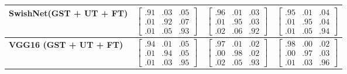 \begin{table}
\begin{tabular}{M{13em}P{6.5em}P{6.5em}P{6.5em}}
		\midrule
		\textbf{SwishNet(GST + UT + FT)} 
		& $\begin{bmatrix}
		.91 & .03 & .05\\
		.01 & .92 & .07\\
		.01 & .05 & .93
		\end{bmatrix}$ & 
		$\begin{bmatrix}
		.96 & .01 & .03\\
		.01 & .95 & .03\\
		.02 & .06 & .92
		\end{bmatrix}$ 
		& $\begin{bmatrix}
		.95 & .01 & .04\\
		.01 & .95 & .04\\
		.01 & .05 & .94
		\end{bmatrix}$ \\
		
		\midrule 
		\textbf{VGG16 (GST + UT + FT)} 
		& $\begin{bmatrix}
		.94 & .01 & .05\\
		.01 & .94 & .05\\
		.01 & .03 & .95
		\end{bmatrix}$ 
		& $\begin{bmatrix}
		.97 & .01 & .02\\
		.00 & .98 & .02\\
		.02 & .05 & .93
		\end{bmatrix}$ 
		& $\begin{bmatrix}
		.98 & .00 & .02\\
		.00 & .97 & .03\\
		.01 & .03 & .96
		\end{bmatrix}$ \\
		\bottomrule
	\end{tabular}
	\label{tab:conmat}%
\end{table}